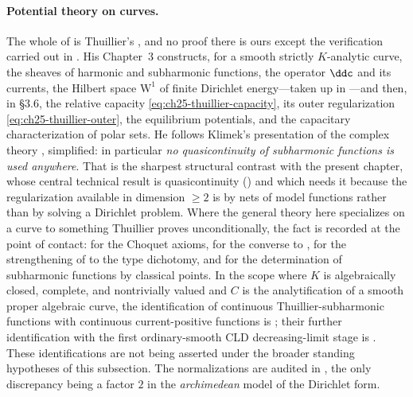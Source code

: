 \paragraph{Potential theory on curves.}  The whole of
 is Thuillier's \cite{Thu05}, and no proof there is
ours except the verification carried out in
.  His Chapter~3 constructs, for a smooth
strictly $K$-analytic curve, the sheaves of harmonic and subharmonic
functions, the operator $\ddc$ and its currents, the Hilbert space
$\mathrm W^1$ of finite Dirichlet energy---taken up in
---and then, in \S3.6, the relative capacity
\eqref{eq:ch25-thuillier-capacity}, its outer regularization
\eqref{eq:ch25-thuillier-outer}, the equilibrium potentials, and the
capacitary characterization of polar sets.  He follows Klimek's presentation
of the complex theory \cite{Kl91}, simplified: in particular
\emph{no quasicontinuity of subharmonic functions is used anywhere}.  That
is the sharpest structural contrast with the present chapter, whose central
technical result is quasicontinuity
() and which needs it because the
regularization available in dimension $\geq2$ is by nets of model
functions rather than by solving a Dirichlet problem.  Where the general
theory here specializes on a curve to something Thuillier proves
unconditionally, the fact is recorded at the point of contact:
 for the Choquet axioms,
 for the converse to
,  for the
strengthening of  to the type
dichotomy, and  for the determination
of subharmonic functions by classical points.  In the scope where $K$ is
algebraically closed, complete, and nontrivially valued and $C$ is the
analytification of a smooth proper algebraic curve, the identification of
continuous Thuillier-subharmonic functions with continuous current-positive
functions is ; their further identification
with the first ordinary-smooth CLD decreasing-limit stage is
.  These identifications
are not being asserted under the broader standing hypotheses of this
subsection.  The normalizations are audited in
, the
only discrepancy being a factor $2$ in the \emph{archimedean} model of the
Dirichlet form.


